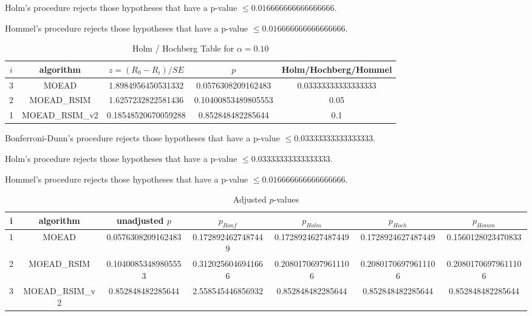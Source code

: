 \documentclass[a4paper,10pt]{article}
\begin{document}
\begin{landscape}
Holm's procedure rejects those hypotheses that have a p-value $\le0.016666666666666666$.


Hommel's procedure rejects those hypotheses that have a p-value $\le0.016666666666666666$.


\begin{table}[!htp]
\centering\tiny
\caption{Holm / Hochberg Table for $\alpha=0.10$}
\begin{tabular}{ccccc}
$i$&algorithm&$z=(R_0 - R_i)/SE$&$p$&Holm/Hochberg/Hommel\\
\hline
3&MOEAD&1.8984956450531332&0.0576308209162483&0.03333333333333333\\
2&MOEAD_RSIM&1.6257232822581436&0.10400853489805553&0.05\\
1&MOEAD_RSIM_v2&0.18548520670059288&0.852848482285644&0.1\\
\hline
\end{tabular}
\end{table}
Bonferroni-Dunn's procedure rejects those hypotheses that have a p-value $\le0.03333333333333333$.


Holm's procedure rejects those hypotheses that have a p-value $\le0.03333333333333333$.


Hommel's procedure rejects those hypotheses that have a p-value $\le0.016666666666666666$.


\begin{table}[!htp]
\centering\tiny
\caption{Adjusted $p$-values}
\begin{tabular}{ccccccc}
i&algorithm&unadjusted $p$&$p_{Bonf}$&$p_{Holm}$&$p_{Hoch}$&$p_{Homm}$\\
\hline
1&MOEAD&0.0576308209162483&0.1728924627487449&0.1728924627487449&0.1728924627487449&0.1560128023470833\\
2&MOEAD_RSIM&0.10400853489805553&0.3120256046941666&0.20801706979611106&0.20801706979611106&0.20801706979611106\\
3&MOEAD_RSIM_v2&0.852848482285644&2.558545446856932&0.852848482285644&0.852848482285644&0.852848482285644\\
\hline
\end{tabular}
\end{table}


\end{landscape}
\end{document}
